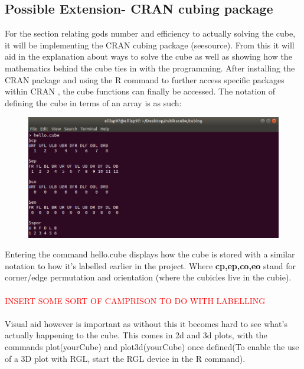 \documentclass{article}
\begin{document}
\paragraph*{}
\newpage
\subsection*{Possible Extension- CRAN cubing package}

For the section relating gods number and efficiency to actually solving the cube, it will be implementing the CRAN cubing package (seesource). From this it will
aid in the explanation about ways to solve the cube as well as showing how the mathematics behind the cube ties in with the programming.
After installing the CRAN package and using the R command to further access specific packages within CRAN , the cube functions can finally be accessed. The notation of defining the cube in terms of an array is as such:

\begin{figure}[h]
	\centering
	\includegraphics[scale=.75]{terminalcube.png}
\end{figure}
Entering the command hello.cube displays how the cube is stored with a similar notation to how it's labelled earlier in the project. Where \textbf{cp,ep,co,eo} stand for corner/edge permutation and orientation (where the cubicles live in the cubie).
\paragraph*{}
\textcolor{red}{INSERT SOME SORT OF CAMPRISON TO DO WITH LABELLING}
\paragraph*{}
Visual aid however is important as without this it becomes hard to see what's actually happening to the cube. This comes in 2d and 3d plots, with the commands plot(yourCube) and plot3d(yourCube) once defined(To enable the use of a 3D plot with RGL, start the RGL device in the R command).
\end{document}
